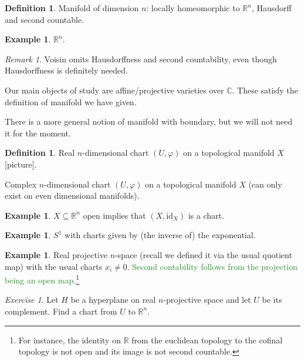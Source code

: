 \documentclass[11pt,A4]{article}
\theoremstyle{plain}
\theoremstyle{definition}
\newtheorem{defn}[thm]{Definition}
\newtheorem{exa}[thm]{Example}
\theoremstyle{remark}
\newtheorem{rem}[thm]{Remark}
\newtheorem{exe}[thm]{Exercise}
\newcommand{\R}{\mathbb{R}}
\newcommand{\1}{\mathbbm{1}}
\newcommand{\C}{\mathbb{C}}
\newcommand{\id}{\mathrm{id}}
\begin{document}
\begin{defn}
    Manifold of dimension $n$: locally homeomorphic to $\R^{n}$, Hausdorff and second countable.
\end{defn}

\begin{exa}
    $\R^{n}$.
\end{exa}

\begin{rem}
    Voisin omits Hausdorffness and second countability, even though Hausdorffness is definitely needed.
\end{rem}

Our main objects of study are affine/projective varieties over $\C$.
These satisfy the definition of manifold we have given.

There is a more general notion of manifold with boundary, but we will not need it for the moment.

\begin{defn}
    Real $n$-dimensional chart $(U,\varphi)$ on a topological manifold $X$ [picture].

    Complex $n$-dimensional chart $(U,\varphi)$ on a topological manifold $X$ (can only exist on even dimensional manifolds).
\end{defn}

\begin{exa}
    $X\subseteq \R^{n}$ open implies that $(X,\id_{X})$ is a chart.
\end{exa}

\begin{exa}
    $S^{1}$ with charts given by (the inverse of) the exponential.
\end{exa}

\begin{exa}
    Real projective $n$-space (recall we defined it via the usual quotient map) with the usual charts $x_{i}\neq 0$.
    \textcolor{ForestGreen}{Second contability follows from the projection being an open map.}\footnote{For instance, the identity on $\R$ from the euclidean topology to the cofinal topology is not open and its image is not second countable.}
\end{exa}

\begin{exe}
    Let $H$ be a hyperplane on real $n$-projective space and let $U$ be its complement.
    Find a chart from $U$ to $\R^{n}$.
\end{exe}
\end{document}
